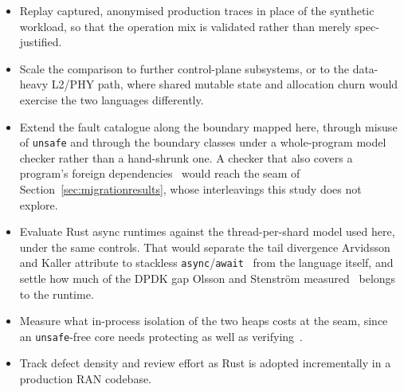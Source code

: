 \documentclass[english,oneside,a4paper,censored,csm,software-track-2020]{HYthesisML}
\begin{document}
\begin{itemize}
\item Replay captured, anonymised production traces in place of the synthetic workload, so that
  the operation mix is validated rather than merely spec-justified.
\item Scale the comparison to further control-plane subsystems, or to the data-heavy L2/PHY path,
  where shared mutable state and allocation churn would exercise the two languages differently.
\item Extend the fault catalogue along the boundary mapped here, through misuse of
  \texttt{unsafe} and through the boundary classes under a whole-program model checker rather
  than a hand-shrunk one. A checker that also covers a program's foreign
  dependencies~\cite{pearce2026rustmc} would reach the seam of
  Section~\ref{sec:migrationresults}, whose interleavings this study does not explore.
\item Evaluate Rust async runtimes against the thread-per-shard model used here, under the same
  controls. That would separate the tail divergence Arvidsson and Kaller
  attribute to stackless \texttt{async}/\texttt{await}~\cite{arvidsson2025async} from the language
  itself, and settle how much of the DPDK gap Olsson and Stenstr\"om
  measured~\cite{olsson2023asyncpackets} belongs to the runtime.
\item Measure what in-process isolation of the two heaps costs at the seam, since an
  \texttt{unsafe}-free core needs protecting as well as
  verifying~\cite{rivera2021galeed,kirth2022pkrusafe}.
\item Track defect density and review effort as Rust is adopted incrementally in a production RAN
  codebase.
\end{itemize}



\cleardoublepage %

\printbibliography
\end{document}
